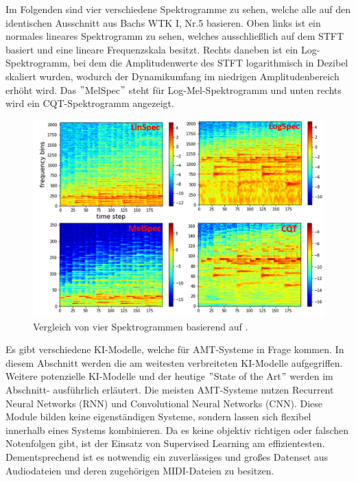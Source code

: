 Im Folgenden sind vier verschiedene Spektrogramme zu sehen,
welche alle auf den identischen Ausschnitt aus Bachs WTK I, Nr.5 \cite{bach_wtk1_nr5} basieren.
Oben links ist ein normales lineares Spektrogramm zu sehen,
welches ausschließlich auf dem STFT basiert und eine lineare Frequenzskala besitzt.
Rechts daneben ist ein Log-Spektrogramm,
bei dem die Amplitudenwerte des STFT logarithmisch in Dezibel skaliert wurden,
wodurch der Dynamikumfang im niedrigen Amplitudenbereich erhöht wird.
Das \("\)MelSpec\("\) steht für Log-Mel-Spektrogramm und unten rechts wird ein CQT-Spektrogramm angezeigt.
\begin{figure}[H]
    \centering
    \includegraphics[width=1\textwidth]{Graphics/different_spectrograms}
    \caption[Vergleich 4 Spektrogramme]{Vergleich von vier Spektrogrammen basierend auf \cite{cheuk2020impact}.}
    \label{fig:different_specs}
\end{figure}

Es gibt verschiedene KI-Modelle, welche für AMT-Systeme in Frage kommen.
In diesem Abschnitt werden die am weitesten verbreiteten KI-Modelle aufgegriffen.
Weitere potenzielle KI-Modelle und der heutige
\("\)State of the Art\("\) werden im Abschnitt- ausführlich erläutert.
Die meisten AMT-Systeme nutzen Recurrent Neural Networks (RNN) und Convolutional Neural Networks (CNN).
\cite{Boeck2012}
Diese Module bilden keine eigenständigen Systeme, sondern lassen sich flexibel innerhalb eines Systems kombinieren.
Da es keine objektiv richtigen oder falschen Notenfolgen gibt, ist der Einsatz von Supervised Learning am effizientesten.
Dementsprechend ist es notwendig ein zuverlässiges und großes Datenset aus Audiodateien und deren zugehörigen MIDI-Dateien zu besitzen.

